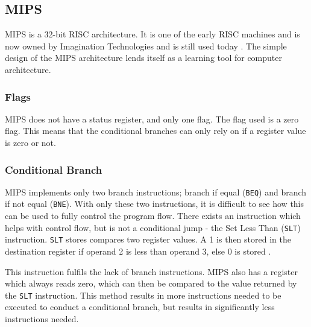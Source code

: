 \documentclass[12pt,a4paper]{article}
\begin{document}
\begin{bibunit}[is-unsrt]
\begin{lstlisting}[frame=single,caption=Intel 8086 assembler for listing \ref{ListC2},label=intel2]
\end{lstlisting}

\subsection{MIPS}

MIPS is a 32-bit RISC architecture.
It is one of the early RISC machines and is now owned by Imagination Technologies and is still used today \cite{mips:wiki}.
The simple design of the MIPS architecture lends itself as a learning tool for computer architecture.

\subsubsection{Flags}

MIPS does not have a status register, and only one flag.
The flag used is a zero flag. 
This means that the conditional branches can only rely on if a register value is zero or not.


\subsubsection{Conditional Branch}

MIPS implements only two branch instructions; branch if equal (\texttt{BEQ}) and branch if not equal (\texttt{BNE}).
With only these two instructions, it is difficult to see how this can be used to fully control the program flow.
There exists an instruction which helps with control flow, but is not a conditional jump - the Set Less Than (\texttt{SLT}) instruction.
\texttt{SLT} stores compares two register values.
A 1 is then stored in the destination register if operand 2 is less than operand 3, else 0 is stored \cite{patterson2013computer}.

This instruction fulfils the lack of branch instructions.
MIPS also has a register which always reads zero, which can then be compared to the value returned by the \texttt{SLT} instruction.
This method results in more instructions needed to be executed to conduct a conditional branch, but results in significantly less instructions needed.



\end{bibunit}
\end{document}
